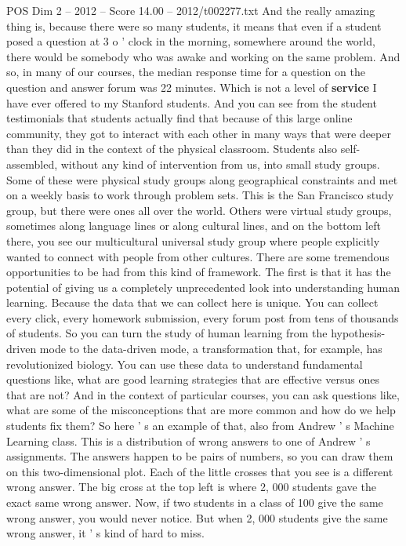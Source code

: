 \begin{textsample}{POS Dim 2 – 2012 – Score 14.00 – 2012/t002277.txt}
And the really amazing thing is, because there were so many students, it means that even if a student posed a question at 3 o ' clock in the morning, somewhere around the world, there would be somebody who was awake and working on the same problem.
And so, in many of our courses, the median response time for a question on the question and answer forum was 22 minutes.
Which is not a level of \textbf{service} I have ever offered to my Stanford students.
And you can see from the student testimonials that students actually find that because of this large online community, they got to interact with each other in many ways that were deeper than they did in the context of the physical classroom.
Students also self-assembled, without any kind of intervention from us, into small study groups.
Some of these were physical study groups along geographical constraints and met on a weekly basis to work through problem sets.
This is the San Francisco study group, but there were ones all over the world.
Others were virtual study groups, sometimes along language lines or along cultural lines, and on the bottom left there, you see our multicultural universal study group where people explicitly wanted to connect with people from other cultures.
There are some tremendous opportunities to be had from this kind of framework.
The first is that it has the potential of giving us a completely unprecedented look into understanding human learning.
Because the data that we can collect here is unique.
You can collect every click, every homework submission, every forum post from tens of thousands of students.
So you can turn the study of human learning from the hypothesis-driven mode to the data-driven mode, a transformation that, for example, has revolutionized biology.
You can use these data to understand fundamental questions like, what are good learning strategies that are effective versus ones that are not?
And in the context of particular courses, you can ask questions like, what are some of the misconceptions that are more common and how do we help students fix them?
So here ' s an example of that, also from Andrew ' s Machine Learning class.
This is a distribution of wrong answers to one of Andrew ' s assignments.
The answers happen to be pairs of numbers, so you can draw them on this two-dimensional plot.
Each of the little crosses that you see is a different wrong answer.
The big cross at the top left is where 2, 000 students gave the exact same wrong answer.
Now, if two students in a class of 100 give the same wrong answer, you would never notice.
But when 2, 000 students give the same wrong answer, it ' s kind of hard to miss.

\end{textsample}

